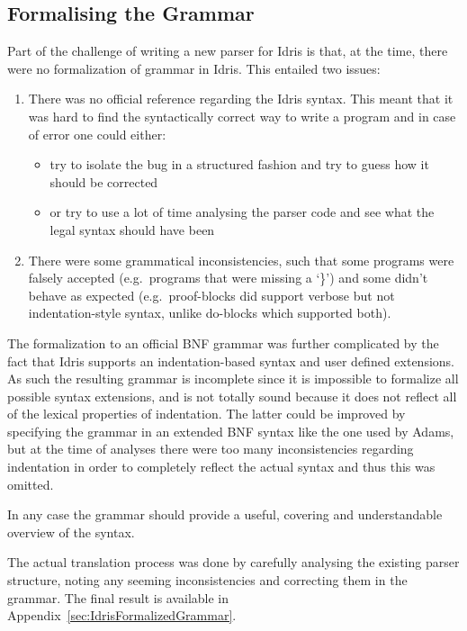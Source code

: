 \documentclass[a4paper]{article}%
\begin{document}
\subsection{Formalising the Grammar}
\label{sub:FormalisingtheGrammar}
Part of the challenge of writing a new parser for Idris is that, at the time, there were no formalization of grammar in Idris.
This entailed two issues:
\begin{enumerate}
  \item There was no official reference regarding the Idris syntax. This meant that it was hard to find the syntactically correct way to write a program and in case of error one could either:
    \begin{itemize}
      \item try to isolate the bug in a structured fashion and try to guess how it should be corrected
      \item or try to use a lot of time analysing the parser code and see what the legal syntax should have been
    \end{itemize}
\item There were some grammatical inconsistencies, such that some programs were falsely accepted (e.g.\ programs that were missing a `\}') and some didn't behave as expected (e.g.\ proof-blocks did support verbose but not indentation-style syntax, unlike do-blocks which supported both).
\end{enumerate}

The formalization to an official BNF grammar was further complicated by the fact that Idris supports an indentation-based syntax and user defined extensions.
As such the resulting grammar is incomplete since it is impossible to formalize all possible syntax extensions,
and is not totally sound because it does not reflect all of the lexical properties of indentation. The latter could be improved by specifying the grammar in an extended BNF syntax like the one used
by Adams\cite{adams2013principled}, but at the time of analyses there were too many inconsistencies regarding indentation in order to completely reflect the actual syntax and thus this was omitted.

In any case the grammar should provide a useful, covering and understandable overview of the syntax.

The actual translation process was done by carefully analysing the existing parser structure, noting any seeming inconsistencies and correcting them in the grammar.
The final result is available in Appendix~\ref{sec:IdrisFormalizedGrammar}.
\end{document}
